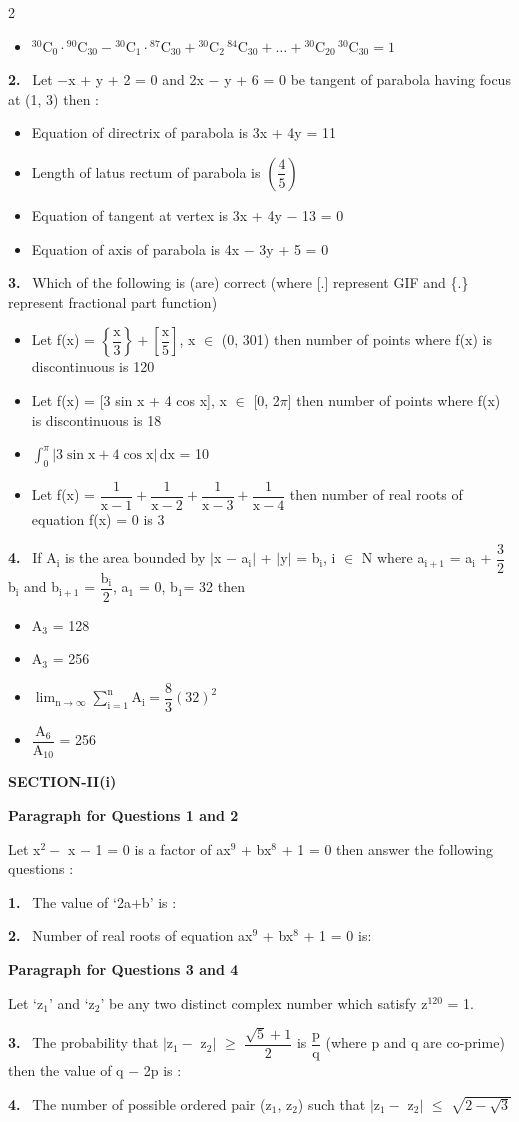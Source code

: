 \documentclass[10pt]{extarticle}
\newcommand{\sect}[1]{\par\smallskip\noindent\textbf{#1}\par}
\newcommand{\qn}[1]{\par\smallskip\noindent\textbf{#1.}~}
\newcommand{\paraq}[2]{\par\smallskip\noindent\textbf{Paragraph for Questions #1 and #2}\par}
\newenvironment{qoptions}{\begin{itemize}[leftmargin=1.8em,itemsep=1pt,topsep=2pt,label={}]}{\end{itemize}}
\newcommand{\opt}[2]{\item[(#1)] #2}
\begin{document}
\begin{multicols}{2}
\begin{qoptions}
\opt{D}{$^{30}\mathrm C_0\cdot{}^{90}\mathrm C_{30}-{}^{30}\mathrm C_1\cdot{}^{87}\mathrm C_{30}+{}^{30}\mathrm C_2\,{}^{84}\mathrm C_{30}+\ldots+{}^{30}\mathrm C_{20}\,{}^{30}\mathrm C_{30}=1$}
\end{qoptions}
\qn{2} Let $-$x + y + 2 = 0 and 2x $-$ y + 6 = 0 be tangent of parabola having focus at (1, 3) then :
\begin{qoptions}
\opt{A}{Equation of directrix of parabola is 3x + 4y = 11}
\opt{B}{Length of latus rectum of parabola is $\left(\dfrac45\right)$}
\opt{C}{Equation of tangent at vertex is 3x + 4y $-$ 13 = 0}
\opt{D}{Equation of axis of parabola is 4x $-$ 3y + 5 = 0}
\end{qoptions}
\qn{3} Which of the following is (are) correct (where [.] represent GIF and \{.\} represent fractional part function)
\begin{qoptions}
\opt{A}{Let f(x) = $\left\{\dfrac{\mathrm x}3\right\}+\left[\dfrac{\mathrm x}5\right]$, x $\in$ (0, 301) then number of points where f(x) is discontinuous is 120}
\opt{B}{Let f(x) = [3 sin x + 4 cos x], x $\in$ [0, 2$\pi$] then number of points where f(x) is discontinuous is 18}
\opt{C}{$\displaystyle\int_0^\pi|3\sin\mathrm x+4\cos\mathrm x|\,\mathrm{dx}$ = 10}
\opt{D}{Let f(x) = $\dfrac1{\mathrm x-1}+\dfrac1{\mathrm x-2}+\dfrac1{\mathrm x-3}+\dfrac1{\mathrm x-4}$ then number of real roots of equation f(x) = 0 is 3}
\end{qoptions}
\qn{4} If A$_\mathrm i$ is the area bounded by $|$x $-$ a$_\mathrm i|$ + $|$y$|$ = b$_\mathrm i$, i $\in$ N where a$_{\mathrm i+1}$ = a$_\mathrm i$ + $\dfrac32$b$_\mathrm i$ and b$_{\mathrm i+1}$ = $\dfrac{\mathrm b_\mathrm i}2$, a$_1$ = 0, b$_1$= 32 then
\begin{qoptions}
\opt{A}{A$_3$ = 128}
\opt{B}{A$_3$ = 256}
\opt{C}{$\displaystyle\lim_{\mathrm n\to\infty}\sum_{\mathrm i=1}^{\mathrm n}\mathrm A_\mathrm i=\dfrac83(32)^2$}
\opt{D}{$\dfrac{\mathrm A_6}{\mathrm A_{10}}$ = 256}
\end{qoptions}
\sect{SECTION-II(i)}
\paraq{1}{2}
Let x$^2-$ x $-$ 1 = 0 is a factor of ax$^9$ + bx$^8$ + 1 = 0 then answer the following questions :
\qn{1} The value of `2a+b' is :
\qn{2} Number of real roots of equation ax$^9$ + bx$^8$ + 1 = 0 is:
\paraq{3}{4}
Let `z$_1$' and `z$_2$' be any two distinct complex number which satisfy z$^{120}$ = 1.
\qn{3} The probability that $|$z$_1-$ z$_2|$ $\geqslant$ $\dfrac{\sqrt5+1}2$ is $\dfrac{\mathrm p}{\mathrm q}$ (where p and q are co-prime) then the value of q $-$ 2p is :
\qn{4} The number of possible ordered pair (z$_1$, z$_2$) such that $|$z$_1-$ z$_2|$ $\leqslant$ $\sqrt{2-\sqrt3}$

\end{multicols}
\end{document}
